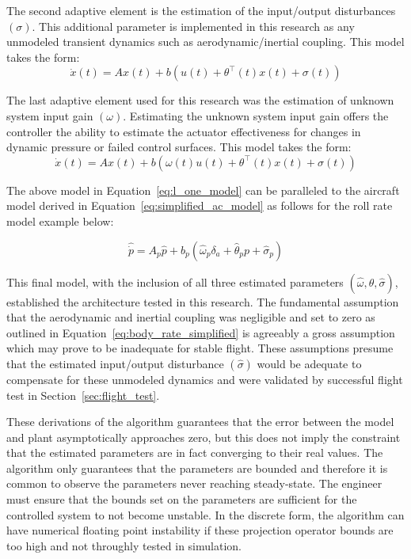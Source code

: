 The second adaptive element is the estimation of the input/output disturbances $(\sigma)$.  This additional parameter is implemented in this research as any unmodeled transient dynamics such as aerodynamic/inertial coupling.  This model takes the form:
\begin{equation}
\dot{x}(t)=Ax(t)+b(u(t)+\theta^{\top}(t)x(t)+\sigma(t))
\end{equation}

The last adaptive element used for this research was the estimation of unknown system input gain $(\omega)$.  Estimating the unknown system input gain offers the controller the ability to estimate the actuator effectiveness for changes in dynamic pressure or failed control surfaces.  This model takes the form:
\begin{equation}\label{eq:l_one_model}
\dot{x}(t)=Ax(t)+b(\omega(t)u(t)+\theta^{\top}(t)x(t)+\sigma(t))
\end{equation}  

The above model in Equation~\ref{eq:l_one_model} can be paralleled to the aircraft model derived in Equation~\ref{eq:simplified_ac_model} as follows for the roll rate model example below:

\begin{equation}
 \hat{\dot{p}}=A_p\hat{p}+b_p\left(\hat{\omega}_p\delta_a+\hat{\theta}_pp+\hat{\sigma}_p\right)
\end{equation}

This final model, with the inclusion of all three estimated parameters $(\hat{\omega}, \hat{\theta}, \hat{\sigma})$, established the architecture tested in this research.  The fundamental assumption that the aerodynamic and inertial coupling was negligible and set to zero as outlined in Equation~\ref{eq:body_rate_simplified} is agreeably a gross assumption which may prove to be inadequate for stable flight.  These assumptions presume that the estimated input/output disturbance $(\hat{\sigma})$ would be adequate to compensate for these unmodeled dynamics and were validated by successful flight test in Section~\ref{sec:flight_test}.  

These derivations of the \Lone algorithm guarantees that the error between the model and plant asymptotically approaches zero, but this does not imply the constraint that the estimated parameters are in fact converging to their real values.  The algorithm only guarantees that the parameters are bounded and therefore it is common to observe the parameters never reaching steady-state.  The engineer must ensure that the bounds set on the parameters are sufficient for the controlled system to not become unstable.  In the discrete form, the algorithm can have numerical floating point instability if these projection operator bounds are too high and not throughly tested in simulation.

